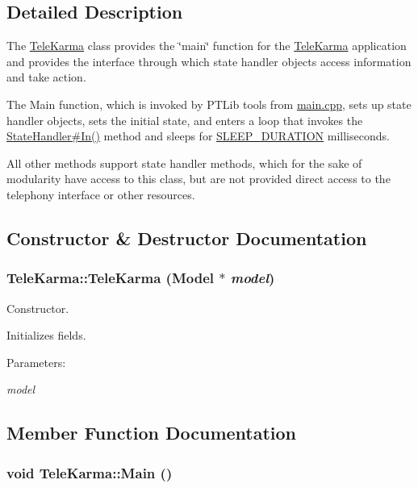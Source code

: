 \subsection{Detailed Description}
The \hyperlink{classTeleKarma}{TeleKarma} class provides the \char`\"{}main\char`\"{} function for the \hyperlink{classTeleKarma}{TeleKarma} application and provides the interface through which state handler objects access information and take action. 

The Main function, which is invoked by PTLib tools from \hyperlink{main_8cpp}{main.cpp}, sets up state handler objects, sets the initial state, and enters a loop that invokes the \hyperlink{}{StateHandler\#In()} method and sleeps for \hyperlink{telekarma_8h_4af2a8a383f07fec0d9f78f2db1c987a}{SLEEP\_\-DURATION} milliseconds. 

All other methods support state handler methods, which for the sake of modularity have access to this class, but are not provided direct access to the telephony interface or other resources.  

\subsection{Constructor \& Destructor Documentation}
\hypertarget{classTeleKarma_ffedc7e09446314b687922735cd7818f}{
\subsubsection[{TeleKarma}]{\setlength{\rightskip}{0pt plus 5cm}TeleKarma::TeleKarma ({\bf Model} $\ast$ {\em model})}}
\label{classTeleKarma_ffedc7e09446314b687922735cd7818f}


Constructor. 

Initializes fields. \begin{Desc}
\item[Parameters:]
\begin{description}
\item[{\em model}]\end{description}
\end{Desc}


\subsection{Member Function Documentation}
\hypertarget{classTeleKarma_addd554bf6335422cc896c894005a031}{
\subsubsection[{Main}]{\setlength{\rightskip}{0pt plus 5cm}void TeleKarma::Main ()}}
\label{classTeleKarma_addd554bf6335422cc896c894005a031}


